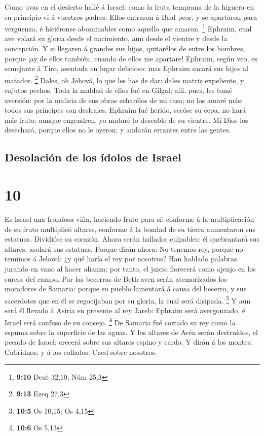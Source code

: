  Como uvas en el desierto hallé á Israel: como la fruta
temprana de la higuera en su principio vi á vuestros padres. Ellos
entraron á Baal-peor, y se apartaron para vergüenza, é hiciéronse
abominables como aquello que amaron. \footnote{\textbf{9:10} Deut 32,10;
  Núm 25,3}  Ephraim, cual ave volará su gloria desde el
nacimiento, aun desde el vientre y desde la concepción. 
Y si llegaren á grandes sus hijos, quitarélos de entre los hombres,
porque ¡ay de ellos también, cuando de ellos me apartare!
 Ephraim, según veo, es semejante á Tiro, asentada en
lugar delicioso: mas Ephraim sacará sus hijos al matador. \footnote{\textbf{9:13}
  Ezeq 27,3}  Dales, oh Jehová, lo que les has de dar:
dales matriz expeliente, y enjutos pechos.  Toda la
maldad de ellos fué en Gilgal; allí, pues, les tomé aversión: por la
malicia de sus obras echarélos de mi casa; no los amaré más; todos sus
príncipes son desleales.  Ephraim fué herido, secóse su
cepa, no hará más fruto: aunque engendren, yo mataré lo deseable de su
vientre.  Mi Dios los desechará, porque ellos no le
oyeron; y andarán errantes entre las gentes.

\hypertarget{desolaciuxf3n-de-los-uxeddolos-de-israel}{%
\subsection{Desolación de los ídolos de
Israel}\label{desolaciuxf3n-de-los-uxeddolos-de-israel}}

\hypertarget{section-9}{%
\section{10}\label{section-9}}

 Es Israel una frondosa viña, haciendo fruto para sí:
conforme á la multiplicación de su fruto multiplicó altares, conforme á
la bondad de su tierra aumentaron sus estatuas.  Dividióse
su corazón. Ahora serán hallados culpables: él quebrantará sus altares,
asolará sus estatuas.  Porque dirán ahora: No tenemos rey,
porque no temimos á Jehová: ¿y qué haría el rey por nosotros?
 Han hablado palabras jurando en vano al hacer alianza:
por tanto, el juicio florecerá como ajenjo en los surcos del campo.
 Por las becerras de Beth-aven serán atemorizados los
moradores de Samaria: porque su pueblo lamentará á causa del becerro, y
sus sacerdotes que en él se regocijaban por su gloria, la cual será
disipada. \footnote{\textbf{10:5} Os 10,15; Os 4,15}  Y
aun será él llevado á Asiria en presente al rey Jareb: Ephraim será
avergonzado, é Israel será confuso de su consejo. \footnote{\textbf{10:6}
  Os 5,13}  De Samaria fué cortado su rey como la espuma
sobre la superficie de las aguas.  Y los altares de Avén
serán destruídos, el pecado de Israel; crecerá sobre sus altares espino
y cardo. Y dirán á los montes: Cubridnos; y á los collados: Caed sobre
nosotros.

